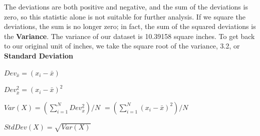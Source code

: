 \documentclass[nohyper,justified]{tufte-handout}\usepackage[]{graphicx}\usepackage[]{color}
\begin{document}
The deviations are both positive and negative, and the sum of the deviations is zero, so this statistic alone is not suitable for further analysis. If we square the deviations, the sum is no longer zero; in fact, the sum of the squared deviations is the \textbf{Variance}. The variance of our dataset is 10.39158 square inches. To get back to our original unit of inches, we take the square root of the variance, 3.2, or \textbf{Standard Deviation}

$Dev_{\bar{x}}=(x_i-\bar{x})$

$Dev_{\bar{x}}^2=(x_i-\bar{x})^2 $

$Var(X)=(\sum_{i=1}^{N} Dev_{\bar{x}}^2)/N$
$=(\sum_{i=1}^{N} (x_i-\bar{x})^2)/N$

$StdDev(X)=\sqrt{Var(X)}$
\end{document}
